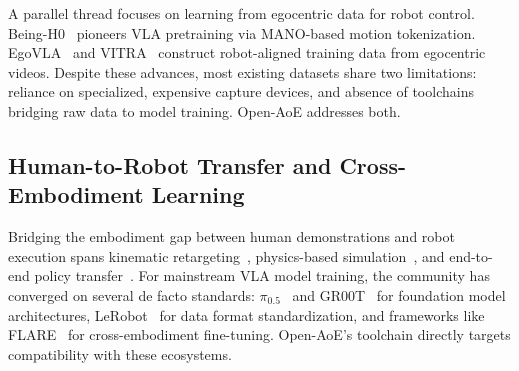 A parallel thread focuses on learning from egocentric data for robot control. Being-H0~\cite{luo2025being} pioneers VLA pretraining via MANO-based motion tokenization. EgoVLA~\cite{egovla2025} and VITRA~\cite{vitra2025} construct robot-aligned training data from egocentric videos. Despite these advances, most existing datasets share two limitations: reliance on specialized, expensive capture devices, and absence of toolchains bridging raw data to model training. Open-AoE addresses both.

\subsection{Human-to-Robot Transfer and Cross-Embodiment Learning}

Bridging the embodiment gap between human demonstrations and robot execution spans kinematic retargeting~\cite{gmr2026,dexretarget}, physics-based simulation~\cite{spider2025,maniptrans2025}, and end-to-end policy transfer~\cite{egomimic2025,twist2025}. For mainstream VLA model training, the community has converged on several de facto standards: $\pi_{0.5}$~\cite{pi05} and GR00T~\cite{groot2025} for foundation model architectures, LeRobot~\cite{lerobot2024} for data format standardization, and frameworks like FLARE~\cite{flare2025} for cross-embodiment fine-tuning. Open-AoE's toolchain directly targets compatibility with these ecosystems.
